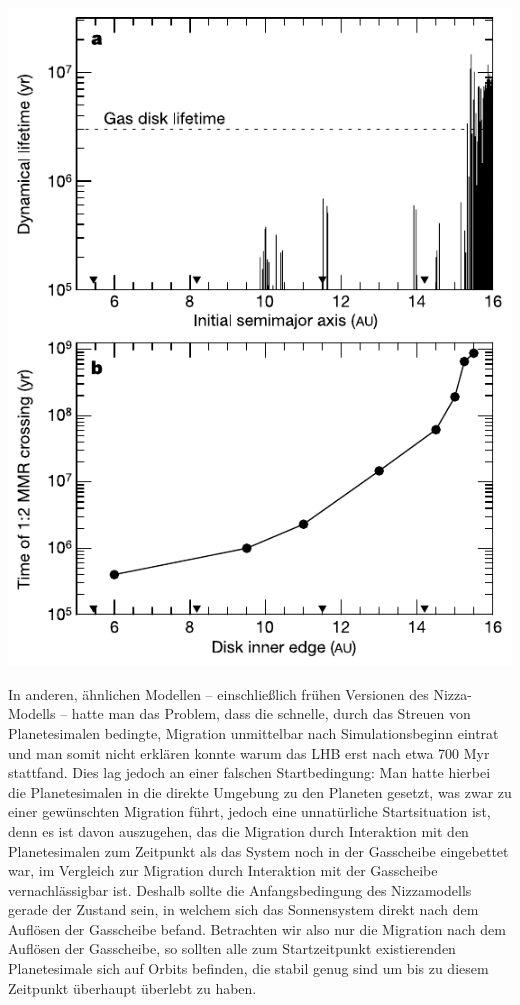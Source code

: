 \documentclass[10pt,a4paper,twoside]{article}
\renewenvironment{figure}{}{}
\begin{document}
\begin{figure}[tbn]
\includegraphics[scale=1]{img/Gomes2005-1.pdf}
\caption{•}
\end{figure}
In anderen, ähnlichen Modellen – einschließlich frühen Versionen des Nizza-Modells – hatte man das Problem, dass die schnelle, durch das Streuen von Planetesimalen bedingte, Migration unmittelbar nach Simulationsbeginn eintrat und man somit nicht erklären konnte warum das LHB erst nach etwa 700 Myr stattfand.
Dies lag jedoch an einer falschen Startbedingung: Man hatte hierbei die Planetesimalen in die direkte Umgebung zu den Planeten gesetzt, was zwar zu einer gewünschten Migration führt, jedoch eine unnatürliche Startsituation ist,
denn es ist davon auszugehen, das die Migration durch Interaktion mit den Planetesimalen zum Zeitpunkt als das System noch in der Gasscheibe eingebettet war, im Vergleich zur Migration durch Interaktion mit der Gasscheibe vernachlässigbar ist.
Deshalb sollte die Anfangsbedingung des Nizzamodells gerade der Zustand sein, in welchem sich das Sonnensystem direkt nach dem Auflösen der Gasscheibe befand. Betrachten wir also nur die Migration nach dem Auflösen der Gasscheibe, so sollten alle zum Startzeitpunkt existierenden Planetesimale sich auf Orbits befinden, die stabil genug sind um bis zu diesem Zeitpunkt überhaupt überlebt zu haben. %
\end{document}
